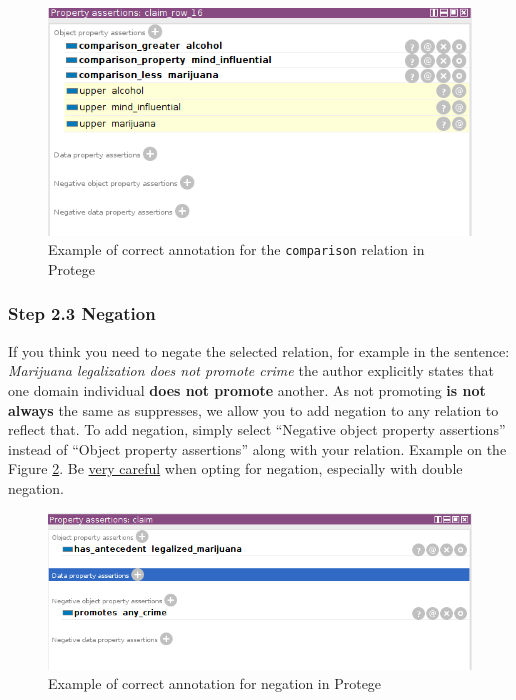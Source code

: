 \begin{figure}
	\includegraphics[scale=0.7]{comparison.png}
	\caption{Example of correct annotation for the \texttt{comparison} relation in Protege}
	\label{fig:comparison_example}
\end{figure}

\subsubsection*{Step 2.3 Negation}

If you think you need to negate the selected relation, for example in the
sentence: \textit{Marijuana legalization does not promote crime} the author explicitly
states that one domain individual \textbf{does not promote} another. As not promoting \textbf{is
not always} the same as suppresses, we allow you to add negation to any
relation to reflect that. To add negation, simply select ``Negative object
property assertions'' instead of ``Object property assertions'' along with your
relation. Example on the Figure \ref{fig:negation_example}. Be \underline{very careful}
when opting for negation, especially with double negation.

\begin{figure}
	\includegraphics[scale=0.7]{negation.png}
	\caption{Example of correct annotation for negation in Protege}
	\label{fig:negation_example}
\end{figure}

